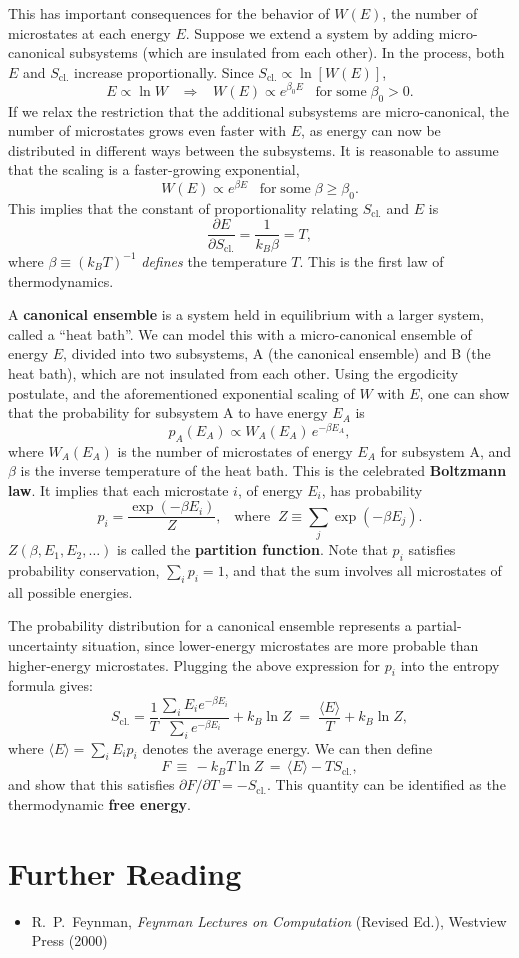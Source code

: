 \documentclass[pra,12pt]{revtex4}
\begin{document}
This has important consequences for the behavior of $W(E)$, the number
of microstates at each energy $E$.  Suppose we extend a system by
adding micro-canonical subsystems (which are insulated from each
other).  In the process, both $E$ and $S_{\mathrm{cl.}}$ increase
proportionally.  Since $S_{\mathrm{cl.}} \propto \ln[W(E)]$,
$$E \propto \ln W \;\;\;\Rightarrow \;\;\;W(E) \propto e^{\beta_0 E} \;\;\; \mathrm{for\;some}\; \beta_0 > 0.$$
If we relax the restriction that the additional subsystems are
micro-canonical, the number of microstates grows even faster with $E$,
as energy can now be distributed in different ways between the
subsystems.  It is reasonable to assume that the scaling is a
faster-growing exponential,
$$W(E) \propto e^{\beta E} \;\;\; \mathrm{for\;some}\; \beta \ge \beta_0.$$
This implies that the constant of proportionality relating
$S_{\mathrm{cl.}}$ and $E$ is
$$\frac{\partial E}{\partial S_{\mathrm{cl.}}} = \frac{1}{k_B \beta} = T,$$
where $\beta \equiv (k_BT)^{-1}$ \textit{defines} the temperature $T$.
This is the first law of thermodynamics.

A \textbf{canonical ensemble} is a system held in equilibrium with a
larger system, called a ``heat bath''.  We can model this with a
micro-canonical ensemble of energy $E$, divided into two subsystems, A
(the canonical ensemble) and B (the heat bath), which are not
insulated from each other.  Using the ergodicity postulate, and the
aforementioned exponential scaling of $W$ with $E$, one can show that
the probability for subsystem A to have energy $E_A$ is
$$p_A(E_A) \propto W_A(E_A) \, e^{-\beta E_A},$$
where $W_A(E_A)$ is the number of microstates of energy $E_A$ for
subsystem A, and $\beta$ is the inverse temperature of the heat bath.
This is the celebrated \textbf{Boltzmann law}.  It implies that each
microstate $i$, of energy $E_i$, has probability
$$p_i = \frac{\exp(-\beta E_i)}{Z}, \;\;\;\mathrm{where}\;\;Z \equiv \sum_j \exp(-\beta E_j).$$
$Z(\beta,E_1, E_2,\dots)$ is called the \textbf{partition function}.
Note that $p_i$ satisfies probability conservation, $\sum_i p_i = 1$,
and that the sum involves all microstates of all possible energies.

The probability distribution for a canonical ensemble represents a
partial-uncertainty situation, since lower-energy microstates are
more probable than higher-energy microstates.  Plugging the above
expression for $p_i$ into the entropy formula gives:
$$S_{\mathrm{cl.}} = \frac{1}{T} \frac{\sum_i E_i e^{-\beta E_i}}{\sum_i e^{-\beta E_i}} + k_B \ln Z \;=\; \frac{\langle E\rangle}{T} + k_B \ln Z,$$
where $\langle E\rangle = \sum_i E_i p_i$ denotes the average energy.
We can then define
$$F \,\equiv\, - k_B T \ln Z \,=\, \langle E \rangle - TS_{\mathrm{cl.}},$$
and show that this satisfies $\partial F/\partial T = -
S_{\mathrm{cl.}}$.  This quantity can be identified as the
thermodynamic \textbf{free energy}.

\section*{Further Reading}

\begin{itemize}
\item R.~P.~Feynman, \textit{Feynman Lectures on Computation} (Revised
  Ed.), Westview Press (2000)
\label{cite:feynman}
\end{itemize}
\end{document}
